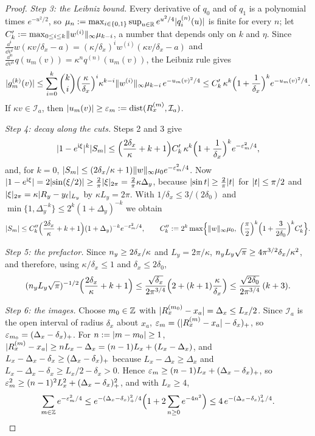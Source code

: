 \begin{proof}
\emph{Step 3: the Leibniz bound.} Every derivative of $q_0$ and of $q_1$ is a polynomial times $e^{-u^2/2}$, so
$\mu_n:=\max_{i\in\{0,1\}}\sup_{u\in\mathbb{R}}e^{u^2/4}\lvert q_i^{(n)}(u)\rvert$ is finite for every $n$; let
$C'_k:=\max_{0\le i\le k}\lVert w^{(i)}\rVert_\infty\mu_{k-i}$, a number that depends only on $k$ and $\eta$. Since
$\frac{\dd^i}{\dd v^i}w(\kappa v/\delta_x-a)=(\kappa/\delta_x)^iw^{(i)}(\kappa v/\delta_x-a)$ and
$\frac{\dd^n}{\dd v^n}q(u_m(v))=\kappa^nq^{(n)}(u_m(v))$, the Leibniz rule gives
\[
\lvert g_m^{(k)}(v)\rvert\le\sum_{i=0}^k\binom ki\Bigl(\frac\kappa{\delta_x}\Bigr)^i\kappa^{k-i}\lVert w^{(i)}\rVert_\infty\mu_{k-i}\,
e^{-u_m(v)^2/4}\le C'_k\,\kappa^k\Bigl(1+\frac1{\delta_x}\Bigr)^ke^{-u_m(v)^2/4}.
\]
If $\kappa v\in\mathcal I_a$, then $\lvert u_m(v)\rvert\ge\varepsilon_m:=\operatorname{dist}(R^{(m)}_x,\mathcal I_a)$.

\emph{Step 4: decay along the cuts.} Steps 2 and 3 give
\[
\lvert1-e^{\mathrm{i}\xi}\rvert^k\lvert S_m\rvert\le\Bigl(\frac{2\delta_x}\kappa+k+1\Bigr)C'_k\,\kappa^k\Bigl(1+\frac1{\delta_x}\Bigr)^ke^{-\varepsilon_m^2/4},
\]
and, for $k=0$, $\lvert S_m\rvert\le(2\delta_x/\kappa+1)\lVert w\rVert_\infty\mu_0e^{-\varepsilon_m^2/4}$. Now
$\lvert1-e^{\mathrm{i}\xi}\rvert=2\lvert\sin(\xi/2)\rvert\ge\frac2\pi\lvert\xi\rvert_{2\pi}=\frac2\pi\kappa\Delta_y$, because $\lvert\sin t\rvert\ge\frac2\pi\lvert t\rvert$
for $\lvert t\rvert\le\pi/2$ and $\lvert\xi\rvert_{2\pi}=\kappa\lvert R_y-y_\ell\rvert_{L_y}$ by $\kappa L_y=2\pi$. With $1/\delta_x\le3/(2\delta_0)$
and $\min\{1,\Delta_y^{-k}\}\le2^k(1+\Delta_y)^{-k}$ we obtain
\[
\abs{S_m}\le C''_k\Bigl(\frac{2\delta_x}\kappa+k+1\Bigr)(1+\Delta_y)^{-k}e^{-\varepsilon_m^2/4},\qquad
C''_k:=2^k\max\Bigl\{\norm w_\infty\mu_0,\ \Bigl(\frac\pi2\Bigr)^k\Bigl(1+\frac3{2\delta_0}\Bigr)^kC'_k\Bigr\}.
\]

\emph{Step 5: the prefactor.} Since $n_y\ge2\delta_x/\kappa$ and $L_y=2\pi/\kappa$, $n_y L_y\sqrt\pi\ge4\pi^{3/2}\delta_x/\kappa^2$,
and therefore, using $\kappa/\delta_x\le1$ and $\delta_x\le2\delta_0$,
\[
(n_y L_y\sqrt\pi)^{-1/2}\Bigl(\frac{2\delta_x}\kappa+k+1\Bigr)\le\frac{\sqrt{\delta_x}}{2\pi^{3/4}}\Bigl(2+(k+1)\frac\kappa{\delta_x}\Bigr)
\le\frac{\sqrt{2\delta_0}}{2\pi^{3/4}}\,(k+3).
\]

\emph{Step 6: the images.} Choose $m_0\in\mathbb{Z}$ with $\lvert R^{(m_0)}_x-x_a\rvert=\Delta_x\le L_x/2$. Since $\mathcal I_a$ is the
open interval of radius $\delta_x$ about $x_a$, $\varepsilon_m=(\lvert R^{(m)}_x-x_a\rvert-\delta_x)_{+}$, so
$\varepsilon_{m_0}=(\Delta_x-\delta_x)_{+}$. For $n:=\lvert m-m_0\rvert\ge1$,
$\lvert R^{(m)}_x-x_a\rvert\ge nL_x-\Delta_x=(n-1)L_x+(L_x-\Delta_x)$, and $L_x-\Delta_x-\delta_x\ge(\Delta_x-\delta_x)_{+}$
because $L_x-\Delta_x\ge\Delta_x$ and $L_x-\Delta_x-\delta_x\ge L_x/2-\delta_x>0$. Hence
$\varepsilon_m\ge(n-1)L_x+(\Delta_x-\delta_x)_{+}$, so $\varepsilon_m^2\ge(n-1)^2L_x^2+(\Delta_x-\delta_x)_{+}^2$, and with $L_x\ge4$,
\[
\sum_{m\in\mathbb{Z}}e^{-\varepsilon_m^2/4}\le e^{-(\Delta_x-\delta_x)_{+}^2/4}\Bigl(1+2\sum_{n\ge0}e^{-4n^2}\Bigr)\le4\,e^{-(\Delta_x-\delta_x)_{+}^2/4}.
\]


\end{proof}
